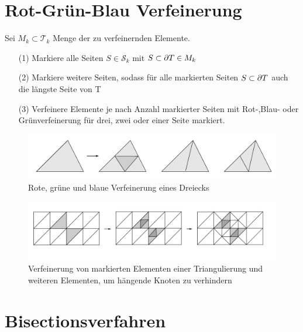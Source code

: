 \section{Rot-Grün-Blau Verfeinerung}
\begin{algorithmus}
    Sei $M_k\subset \mathscr{T}_k$ Menge der zu verfeinernden Elemente.
	\begin{itemize}
		\item[(1)] Markiere alle Seiten $S \in \mathscr{S}_k$ mit $S \subset \partial T\in M_k$
		\item[(2)] Markiere weitere Seiten, sodass für alle markierten Seiten $S\subset \partial T$  auch die längste Seite von T
		\item[(3)] Verfeinere Elemente je nach Anzahl markierter Seiten mit  Rot-,Blau- oder Grünverfeinerung für drei, zwei oder einer Seite markiert.
	\end{itemize}
\end{algorithmus}
\begin{figure}[!htbp]
	\begin{center}
		\includegraphics[width=16cm]{pics/redref.png}
	\end{center}
	\caption{Rote, grüne und blaue Verfeinerung eines Dreiecks}
\end{figure}
\begin{figure}[!htbp]
	\begin{center}
		\includegraphics[width=16cm]{pics/refin.png}
	\end{center}
	\caption{Verfeinerung von markierten Elementen einer Triangulierung und weiteren Elementen, um hängende Knoten zu verhindern}
\end{figure}
\section{Bisectionsverfahren}